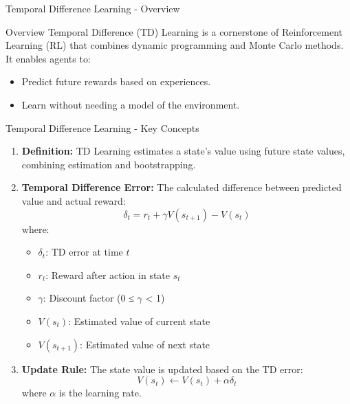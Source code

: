 \documentclass[aspectratio=169]{beamer}
\begin{document}
\begin{frame}[fragile]{Temporal Difference Learning - Overview}
    \begin{block}{Overview}
        Temporal Difference (TD) Learning is a cornerstone of Reinforcement Learning (RL) that combines dynamic programming and Monte Carlo methods. It enables agents to:
        \begin{itemize}
            \item Predict future rewards based on experiences.
            \item Learn without needing a model of the environment.
        \end{itemize}
    \end{block}
\end{frame}

\begin{frame}[fragile]{Temporal Difference Learning - Key Concepts}
    \begin{enumerate}
        \item \textbf{Definition:} 
            TD Learning estimates a state's value using future state values, combining estimation and bootstrapping.
            
        \item \textbf{Temporal Difference Error:} 
            The calculated difference between predicted value and actual reward:
            \begin{equation}
                \delta_t = r_t + \gamma V(s_{t+1}) - V(s_t)
            \end{equation}
            where:
            \begin{itemize}
                \item \( \delta_t \): TD error at time \( t \)
                \item \( r_t \): Reward after action in state \( s_t \)
                \item \( \gamma \): Discount factor (0 ≤ \( \gamma \) < 1)
                \item \( V(s_t) \): Estimated value of current state
                \item \( V(s_{t+1}) \): Estimated value of next state
            \end{itemize}
        
        \item \textbf{Update Rule:} 
            The state value is updated based on the TD error:
            \begin{equation}
                V(s_t) \leftarrow V(s_t) + \alpha \delta_t
            \end{equation}
            where \( \alpha \) is the learning rate.
    \end{enumerate}
\end{frame}
\end{document}

